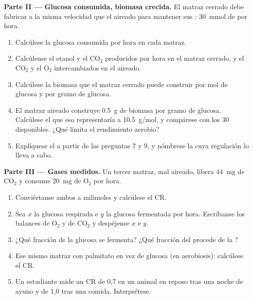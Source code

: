 \begin{problem}
\medskip
\noindent\textbf{Parte II --- Glucosa consumida, biomasa crecida.}
El matraz cerrado debe fabricar  a la misma velocidad que el aireado para
mantener sus : \qty{30}{mmol} de  por hora.
\begin{enumerate}[resume]
  \item Calcúlese la glucosa consumida por hora en cada matraz.
  \item Calcúlense el etanol y el $\mathrm{CO_2}$ producidos por hora en el
        matraz cerrado, y el $\mathrm{CO_2}$ y el $\mathrm{O_2}$
        intercambiados en el aireado.
  \item Calcúlese la biomasa que el matraz cerrado puede construir por mol
        de glucosa y por gramo de glucosa.
  \item El matraz aireado construye \qty{0.5}{g} de biomasa por gramo de
        glucosa. Calcúlese el  que eso representaría a \qty{10.5}{g/mol},
        y compárese con los 30  disponibles. ¿Qué limita el rendimiento
        aerobio?
  \item Explíquese el  a partir de las preguntas 7 y 9, y
        nómbrese la  cuya regulación lo lleva a cabo.
\end{enumerate}

\medskip
\noindent\textbf{Parte III --- Gases medidos.}
Un tercer matraz, mal aireado, libera \qty{44}{mg} de $\mathrm{CO_2}$ y
consume \qty{20}{mg} de $\mathrm{O_2}$ por hora.
\begin{enumerate}[resume]
  \item Conviértanse ambos a milimoles y calcúlese el CR.
  \item Sea $x$ la glucosa respirada e $y$ la glucosa fermentada por hora.
        Escríbanse los balances de $\mathrm{O_2}$ y de $\mathrm{CO_2}$ y
        despéjense $x$ e $y$.
  \item ¿Qué fracción de la glucosa se fermenta? ¿Qué fracción del 
        procede de la ?
  \item Ese mismo matraz con palmitato en vez de glucosa (en aerobiosis):
        calcúlese el CR.
  \item Un estudiante mide un CR de 0,7 en un animal en reposo tras una
        noche de ayuno y de 1,0 tras una comida. Interprétese.
\end{enumerate}


\end{problem}
